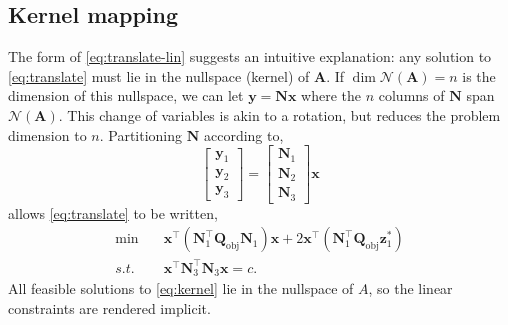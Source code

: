 \documentclass[journal,twoside]{IEEEtran}
\renewcommand{\vec}[1]{\mathbf{#1}}
\begin{document}
\subsection{Kernel mapping}\label{sec:solution-kernel}
The form of \eqref{eq:translate-lin} suggests an intuitive explanation: any solution to \eqref{eq:translate} must lie in the nullspace (kernel) of $\mathbf{A}$. If $\dim \mathcal{N}(\mathbf{A}) = n$ is the dimension of this nullspace, we can let $\vec{y}=\mathbf{N}\vec{x}$ where the $n$ columns of $\mathbf{N}$ span $\mathcal{N}(\mathbf{A})$. This change of variables is akin to a rotation, but reduces the problem dimension to $n$. Partitioning $\mathbf{N}$ according to,
\[
\begin{bmatrix} \vec{y}_1 \\ \vec{y}_2 \\ \vec{y}_3 \end{bmatrix} = \begin{bmatrix} \mathbf{N}_1
  \\ \mathbf{N}_2 \\ \mathbf{N}_3 \end{bmatrix} \vec{x}
\]
allows \eqref{eq:translate} to be written,
\begin{subequations}\label{eq:kernel}
\begin{align}
\label{eq:kernel-obj} \min\quad  &\vec{x}^\top (\mathbf{N}_1^\top \mathbf{Q}_\text{obj}\mathbf{N}_1) \vec{x} + 2\vec{x}^\top
(\mathbf{N}_1^\top \mathbf{Q}_\text{obj} \vec{z}_1^*) \\
\label{eq:kernel-quad} s.t.\quad &\vec{x}^\top \mathbf{N}_3^\top \mathbf{N}_3 \vec{x} = c.
\end{align}
\end{subequations}
All feasible solutions to \eqref{eq:kernel} lie in the nullspace of $A$, so the linear constraints are rendered implicit.
\end{document}
